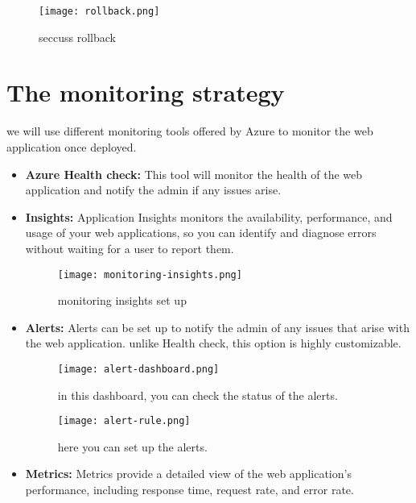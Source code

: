 \begin{figure}[htbp]
    \centering
    \texttt{[image: rollback.png]}
    \caption{seccuss rollback}
    \label{fig:rollback-seccuss}
\end{figure}

\section{The monitoring strategy \cite{webArticle7}}
we will use different monitoring tools offered by Azure to monitor the web application once deployed.
\begin{itemize}
    \item \textbf{Azure Health check:} This tool will monitor the health of the web application and notify the admin if any issues arise.
    \item \textbf{Insights:} Application Insights monitors the availability, performance, and usage of your web applications, so you can identify and diagnose errors without waiting for a user to report them.

          \begin{figure}[htbp]
              \centering
              \texttt{[image: monitoring-insights.png]}
              \caption{monitoring insights set up}
              \label{fig:monitoring-insights}
          \end{figure}

    \item \textbf{Alerts:} Alerts can be set up to notify the admin of any issues that arise with the web application. unlike Health check, this option is highly customizable.

          \begin{figure}[htbp]
              \centering
              \texttt{[image: alert-dashboard.png]}
              \caption{in this dashboard, you can check the status of the alerts.}
              \label{fig:monitoring-alerts}
          \end{figure}

          \begin{figure}[htbp]
              \centering
              \texttt{[image: alert-rule.png]}
              \caption{here you can set up the alerts.}
              \label{fig:monitoring-set-up-alerts}
          \end{figure}

    \item \textbf{Metrics:} Metrics provide a detailed view of the web application's performance, including response time, request rate, and error rate.


\end{itemize}
